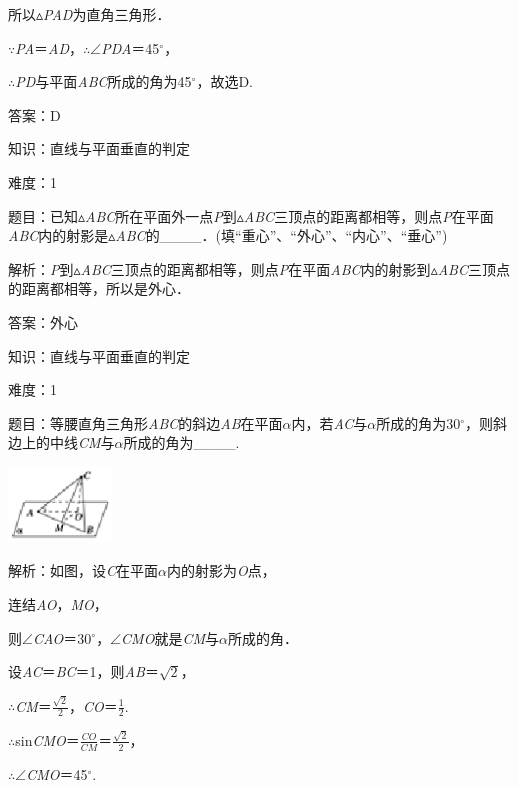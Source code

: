 \documentclass{article} %
\begin{document}
所以$\mathrm{\vartriangle}$\textit{PAD}为直角三角形．

$\mathrm{\because}$\textit{PA}＝\textit{AD}，$\mathrm{\therefore}$$\mathrm{\angle}$\textit{PDA}＝45$\mathrm{{}^\circ}$，

$\mathrm{\therefore}$\textit{PD}与平面\textit{ABC}所成的角为45$\mathrm{{}^\circ}$，故选D.

答案：D


知识：直线与平面垂直的判定

难度：1

题目：已知$\mathrm{\vartriangle}$\textit{ABC}所在平面外一点\textit{P}到$\mathrm{\vartriangle}$\textit{ABC}三顶点的距离都相等，则点\textit{P}在平面\textit{ABC}内的射影是$\mathrm{\vartriangle}$\textit{ABC}的\_\_\_\_．(填``重心''、``外心''、``内心''、``垂心'')

解析：\textit{P}到$\mathrm{\vartriangle}$\textit{ABC}三顶点的距离都相等，则点\textit{P}在平面\textit{ABC}内的射影到$\mathrm{\vartriangle}$\textit{ABC}三顶点的距离都相等，所以是外心．

答案：外心

知识：直线与平面垂直的判定

难度：1

题目：等腰直角三角形\textit{ABC}的斜边\textit{AB}在平面\textit{$\alpha$}内，若\textit{AC}与\textit{$\alpha$}所成的角为30$\mathrm{{}^\circ}$，则斜边上的中线\textit{CM}与\textit{$\alpha$}所成的角为\_\_\_\_.

\includegraphics*[width=1.08in, height=0.79in, keepaspectratio=false]{image196}

解析：如图，设\textit{C}在平面\textit{$\alpha$}内的射影为\textit{O}点，

连结\textit{AO}，\textit{MO}，

则$\mathrm{\angle}$\textit{CAO}＝30$\mathrm{{}^\circ}$，$\mathrm{\angle}$\textit{CMO}就是\textit{CM}与\textit{$\alpha$}所成的角．

设\textit{AC}＝\textit{BC}＝1，则\textit{AB}＝$\sqrt{2}$，

$\mathrm{\therefore}$\textit{CM}＝$\frac{\sqrt{2}}{2}$，\textit{CO}＝$\frac{1}{2}$.

$\mathrm{\therefore}$sin\textit{CMO}＝$\frac{CO}{CM}$＝$\frac{\sqrt{2}}{2}$，

$\mathrm{\therefore}$$\mathrm{\angle}$\textit{CMO}＝45$\mathrm{{}^\circ}$.
\end{document}
